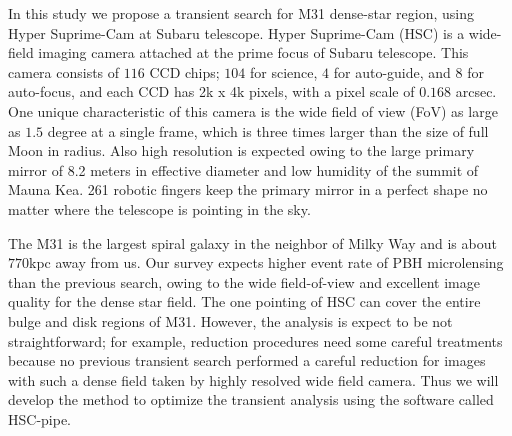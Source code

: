 \documentclass[iop, apj]{emulateapj}
\newcommand{\?}{\stackrel{?}{=}}
\begin{document}
In this study we propose a transient search for M31 dense-star region, using Hyper Suprime-Cam at Subaru telescope. Hyper Suprime-Cam (HSC) is a wide-field imaging camera attached at the prime focus of Subaru telescope. This camera consists of $116$ CCD chips; $104$ for science, $4$ for auto-guide, and $8$ for auto-focus,  and each CCD has 2k x 4k pixels, with a pixel scale of $0.168$ arcsec. One unique characteristic of this camera is the wide field of view (FoV) as large as $1.5$ degree at a single frame, which is three times larger than the size of full Moon in radius. Also high resolution is expected owing to the large primary mirror of 8.2 meters in effective diameter and low humidity of the summit of Mauna Kea. 261 robotic fingers keep the primary mirror in a perfect shape no matter where the telescope is pointing in the sky. 
%

The M31 is the largest spiral galaxy in the neighbor of Milky Way and is about $770$kpc away from us. 
Our survey expects higher event rate of PBH microlensing than the previous search, owing to the wide field-of-view and excellent image quality for the dense star field. The one pointing of HSC can cover the entire bulge and disk regions of M31. However, the analysis is expect to be not straightforward; for example, reduction procedures need some careful treatments because no previous transient search performed a careful reduction for images with such a dense field taken by highly resolved wide field camera. 
Thus we will develop the method to optimize the transient analysis using the software called HSC-pipe. 
\end{document}
